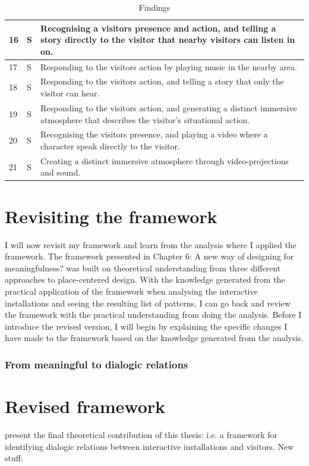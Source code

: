 \begin{table}[H]
\begin{tabular}{| p{0.75cm} | p{1cm} | p{11cm}| }
\hline
16 & S &  Recognising a visitors presence and action, and telling a story directly to the visitor that nearby visitors can listen in on. \\
\hline
17 & S &  Responding to the visitors action by playing music in the nearby area. \\
\hline
18 & S &  Responding to the visitors action, and telling a story that only the visitor can hear. \\
\hline
19 & S &  Responding to the visitors action, and generating a distinct immersive atmosphere that describes the visitor's situational action.\\
\hline
20 & S &  Recognising the visitors presence, and playing a video where a character speak directly to the visitor. \\
\hline
21 & S & Creating a distinct immersive atmosphere through video-projections and sound.  \\
\hline
\end{tabular}
\caption{Findings}
\label{tab:abc}
\end{table}

\section{Revisiting the framework}
I will now revisit my framework and learn from the analysis where I applied the framework. The framework presented in Chapter 6: A new way of designing for meaningfulness? was built on theoretical understanding from three different approaches to place-centered design. With the knowledge generated from the practical application of the framework when analysing the interactive installations and seeing the resulting list of patterns, I can go back and review the framework with the practical understanding from doing the analysis. Before I introduce the revised version, I will begin by explaining the specific changes I have made to the framework based on the knowledge generated from the analysis.

\subsubsection{From meaningful to dialogic relations}

\section{Revised framework}

present the final theoretical contribution of this thesis: i.e. a framework for identifying dialogic relations between interactive installations and visitors. New stuff:

